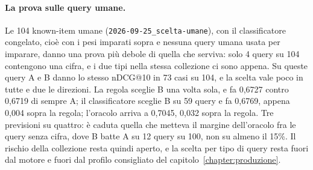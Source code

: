 \paragraph{La prova sulle query umane.} Le 104 known-item umane
(\texttt{2026-09-25\_scelta-umane}), con il classificatore congelato, cioè con i
pesi imparati sopra e nessuna query umana usata per imparare, danno una prova
più debole di quella che serviva: solo 4 query su 104 contengono una cifra, e i
due tipi nella stessa collezione ci sono appena. Su queste query A e B danno lo
stesso nDCG@10 in 73 casi su 104, e la scelta vale poco in tutte e due le
direzioni. La regola sceglie B una volta sola, e fa 0,6727 contro 0,6719 di
sempre A; il classificatore sceglie B su 59 query e fa 0,6769, appena 0,004
sopra la regola; l'oracolo arriva a 0,7045, 0,032 sopra la regola. Tre
previsioni su quattro: è caduta quella che metteva il margine dell'oracolo fra
le query senza cifra, dove B batte A su 12 query su 100, non su almeno il
15\%. Il rischio della collezione resta quindi aperto, e la scelta per tipo di
query resta fuori dal motore e fuori dal profilo consigliato del
capitolo~\ref{chapter:produzione}.
